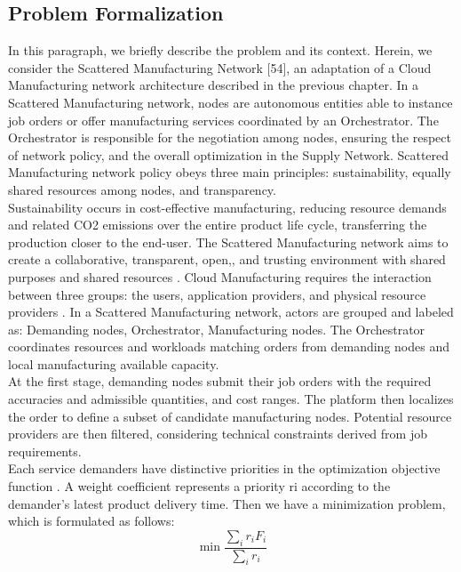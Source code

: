 \subsection{Problem Formalization}
In this paragraph, we briefly describe the problem and its context. Herein, we consider the Scattered Manufacturing Network [54], an adaptation of a Cloud Manufacturing network architecture described in the previous chapter. In a Scattered Manufacturing network, nodes are autonomous entities able to instance job orders or offer manufacturing services coordinated by an Orchestrator. The Orchestrator is responsible for the negotiation among nodes, ensuring the respect of network policy, and the overall optimization in the Supply Network. Scattered Manufacturing network policy obeys three main principles: sustainability, equally shared resources among nodes, and transparency.\\
Sustainability occurs in cost-effective manufacturing, reducing resource demands and related CO2 emissions over the entire product life cycle, transferring the production closer to the end-user. The Scattered Manufacturing network aims to create a collaborative, transparent, open,, and trusting environment with shared purposes and shared resources \parencite{de_falco_negotiating_2017}. Cloud Manufacturing requires the interaction between three groups: the users, application providers, and physical resource providers \parencite{wu_cloud_2013}. In a Scattered Manufacturing network, actors are grouped and labeled as: Demanding nodes, Orchestrator, Manufacturing nodes. The Orchestrator coordinates resources and workloads matching orders from demanding nodes and local manufacturing available capacity.\\
At the first stage, demanding nodes submit their job orders with the required accuracies and admissible quantities, and cost ranges. The platform then localizes the order to define a subset of candidate manufacturing nodes. Potential resource providers are then filtered, considering technical constraints derived from job requirements.\\
Each service demanders have distinctive priorities in the optimization objective function \parencite{zhou_multi-task_2018}. A weight coefficient represents a priority ri according to the demander’s latest product delivery time. Then we have a minimization problem, which is formulated as follows:\\

\begin{equation}
    \label{eq:1}
    \min{\frac{\sum _i r_i F_i}{\sum _i r_i}}
\end{equation}

